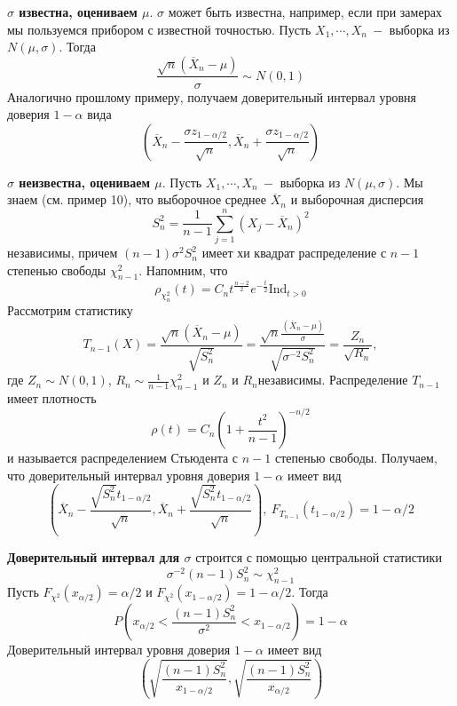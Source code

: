 \par
\textbf{$\sigma $ известна, оцениваем $\mu$}. $\sigma$ может быть известна, например, если при замерах мы пользуемся прибором с известной точностью. Пусть $X_1, \cdots, X_n \ - $ выборка из $N\left(\mu, \sigma\right)$. Тогда 
\[
    \frac{\sqrt{n}\left(\overline{X}_n - \mu\right)}{\sigma} \sim N\left(0, 1\right)
\]
Аналогично прошлому примеру, получаем доверительный интервал уровня доверия $1 - \alpha$ вида
\[
    \left(\overline{X}_n - \frac{\sigma z_{1-\alpha/2}}{\sqrt{n}}, \overline{X}_n + \frac{\sigma z_{1-\alpha/2}}{\sqrt{n}}\right)
\]
\par
\textbf{$\sigma$ неизвестна, оцениваем $\mu$}. Пусть $X_1, \cdots, X_n \ -$ выборка из $N\left(\mu, \sigma\right)$. Мы знаем (см. пример 10), что выборочное среднее $\overline{X}_n$ и выборочная дисперсия
\[
    S_n ^ 2 = \frac1{n - 1} \sum_{j=1}^{n} \left(X_j - \overline{X}_n\right) ^ 2
\]
независимы, причем $\left(n - 1\right)\sigma ^ 2 S_n ^ 2$ имеет хи квадрат распределение с $n - 1$ степенью свободы $\chi^2_{n-1}$. Напомним, что
\[
    \rho_{\chi^2_{n}}\left(t\right) = C_n t ^ {\frac{n-2}2} e ^ {-\frac{t}2} \text{Ind}_{t > 0}
\]
Рассмотрим статистику
\[
    T_{n-1}\left(X\right) =\frac{\sqrt{n}\left(\overline{X}_n - \mu\right)}{\sqrt{S_n ^ 2}} = \frac{\sqrt{n}\frac{\left(\overline{X}_n - \mu\right)}{\sigma}}{\sqrt{\sigma ^{-2} S_n ^ 2}} = \frac{Z_n}{\sqrt{R_n}},
\]
где $Z_n \sim N\left(0, 1\right)$, $R_n \sim \frac 1 {n-1} \chi^2_{n-1}$ и $Z_n$ и $R_n$независимы. Распределение $T_{n-1}$ имеет плотность 
\[
    \rho\left(t\right) = C_n \left(1 + \frac{t^2}{n - 1}\right) ^ {-n/2}
\]
и называется распределением Стьюдента с $n - 1$ степенью свободы. Получаем, что доверительный интервал уровня доверия $1 - \alpha$ имеет вид
\[
    \left(\overline{X}_n - \frac{\sqrt{S^2_n} t_{1-\alpha/2}}{\sqrt n}, \overline{X}_n + \frac{\sqrt{S^2_n} t_{1-\alpha/2}}{\sqrt n}\right), \ F_{T_{n-1}}\left(t_{1-\alpha/2}\right) = 1-\alpha/2
\]
\par
\textbf{Доверительный интервал для $\sigma$} строится с помощью центральной статистики
\[
    \sigma ^ {-2}\left(n - 1\right)S_n ^ 2 \sim \chi_{n-1}^2
\]
Пусть $F_{\chi^2}\left(x_{\alpha/2}\right) = \alpha/2$ и $F_{\chi^2}\left(x_{1-\alpha/2}\right) = 1-\alpha/2$. Тогда 
\[
    P\left(x_{\alpha/2} < \frac{\left(n-1\right) S^2_n}{\sigma^2} < x_{1-\alpha/2}\right) = 1 - \alpha
\]
Доверительный интервал уровня доверия $1 - \alpha$ имеет вид
\[
    \left(\sqrt{\frac{\left(n-1\right) S^2_n}{x_{1-\alpha/2}}}, \sqrt{\frac{\left(n-1\right) S^2_n}{x_{\alpha/2}}}\right)
\]
\clearpage


